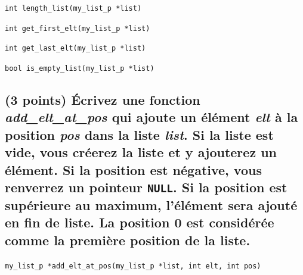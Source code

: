 \documentclass[11pt,a4paper]{article}
\begin{document}
\medskip

\texttt{int length\_list(my\_list\_p *list)}

\begin{center}
\end{center}



\clearpage

\vfillFirst

\texttt{int get\_first\_elt(my\_list\_p *list)}

\begin{center}
\end{center}

\medskip

\texttt{int get\_last\_elt(my\_list\_p *list)}

\begin{center}
\end{center}

\medskip

\texttt{bool is\_empty\_list(my\_list\_p *list)}

\begin{center}
\end{center}


\vfillLast

\newpage

\subsection{(3 points) \'Ecrivez une fonction \og \textit{add\_elt\_at\_pos} \fg{} qui ajoute un élément \textit{elt} à la position \textit{pos} dans la liste \textit{list}. Si la liste est vide, vous créerez la liste et y ajouterez un élément. Si la position est négative, vous renverrez un pointeur \texttt{NULL}. Si la position est supérieure au maximum, l'élément sera ajouté en fin de liste. La position 0 est considérée comme la première position de la liste. }

\bigskip

\texttt{my\_list\_p *add\_elt\_at\_pos(my\_list\_p *list, int elt, int pos)}

\begin{center}
\end{center}

\newpage
\end{document}
